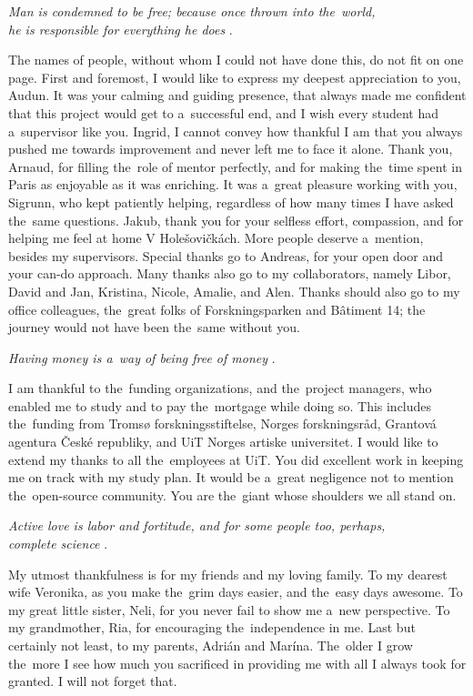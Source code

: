 \begin{center}
    \textit{Man is condemned to be free; because once thrown into the~world,\\ he is responsible for everything he does} \citep{sartre1956being}.
\end{center}
The names of people, without whom I could not have done this, do not fit on one page. First and foremost, I would like to express my deepest appreciation to you, Audun. It was your calming and guiding presence, that always made me confident that this project would get to a~successful end, and I wish every student had a~supervisor like you. Ingrid, I cannot convey how thankful I am that you always pushed me towards improvement and never left me to face it alone. Thank you, Arnaud, for filling the~role of mentor perfectly, and for making the~time spent in Paris as enjoyable as it was enriching. It was a~great pleasure working with you, Sigrunn, who kept patiently helping, regardless of how many times I have asked the~same questions. Jakub, thank you for your selfless effort, compassion, and for helping me feel at home V Holešovičkách. More people deserve a~mention, besides my supervisors. Special thanks go to Andreas, for your open door and your can-do approach. Many thanks also go to my collaborators, namely Libor, David and Jan, Kristina, Nicole, Amalie, and Alen. Thanks should also go to my office colleagues, the~great folks of Forskningsparken and Bâtiment 14; the journey would not have been the~same without you. 
\begin{center}
\textit{Having money is a~way of being free of money} \citep{camus1972happy}. 
\end{center}
I am thankful to the~funding organizations, and the~project managers, who enabled me to study and to pay the~mortgage while doing so. This includes the~funding from Tromsø forskningsstiftelse, Norges forskningsråd, Grantová agentura České republiky, and UiT Norges artiske universitet. I would like to extend my thanks to all the~employees at UiT. You did excellent work in keeping me on track with my study plan. It would be a~great negligence not to mention the~open-source community. You are the~giant whose shoulders we all stand on. 
\begin{center}
\textit{Active love is labor and fortitude, and for some people too, perhaps,\\ complete science} \citep{dostoyevskii1880brothers}.
\end{center}
My utmost thankfulness is for my friends and my loving family. To my dearest wife Veronika, as you make the~grim days easier, and the~easy days awesome. To my great little sister, Neli, for you never fail to show me a~new perspective. To my grandmother, Ria, for encouraging the~independence in me. Last but certainly not least, to my parents, Adrián and Marína. The~older I grow the~more I see how much you sacrificed in providing me with all I always took for granted. I will not forget that.